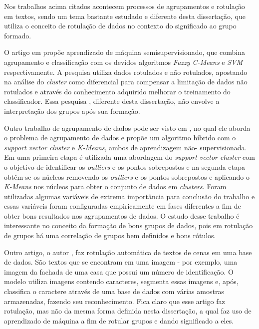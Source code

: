 Nos trabalhos acima citados \cite{Jirasirilerd2018,Yeganova2010,Chen2011} acontecem processos de agrupamentos e rotulação em textos, sendo um tema bastante estudado e diferente desta dissertação, que utiliza o conceito de rotulação de dados no contexto do significado ao grupo formado. 



O artigo em \cite{Gan2013}  propõe aprendizado de máquina semisupervisionado, que combina agrupamento e classificação com os devidos algoritmos \textit{Fuzzy C-Means} e \textit{SVM} respectivamente. A pesquisa utiliza dados rotulados e não rotulados, apostando na análise do \textit{cluster} como diferencial para compensar a limitação de dados não rotulados e através do conhecimento adquirido melhorar o treinamento do classificador. Essa pesquisa \cite{Gan2013}, diferente desta dissertação, não envolve a interpretação dos grupos após sua formação.

Outro trabalho de agrupamento de dados pode ser visto em \cite{Sun2011}, no qual ele aborda o problema de agrupamento de dados e propõe um algoritmo híbrido com o \textit{support vector cluster} e \textit{K-Means}, ambos de aprendizagem não- supervisionada. Em uma primeira etapa é utilizada uma abordagem do \textit{support vector cluster} com o objetivo de identificar os \textit{outliers} e os pontos sobrepostos e na segunda etapa obtêm-se os núcleos removendo os \textit{outliers} e os pontos sobrepostos e aplicando o \textit{K-Means} nos núcleos para obter o conjunto de dados em \textit{clusters}. Foram utilizadas algumas variáveis de extrema importância para conclusão do trabalho e essas variáveis foram configuradas empiricamente em fases diferentes a fim de obter bons resultados nos agrupamentos de dados. O estudo desse trabalho é interessante no conceito da formação de bons grupos de dados, pois em rotulação de grupos há uma correlação de grupos bem definidos e bons rótulos.

Outro artigo, o autor \cite{Iwamura2013}, faz rotulação automática de textos de cenas em uma base de dados. São textos que se encontram em uma imagem - por exemplo, uma imagem da fachada de uma casa que possui um número de identificação. O modelo utiliza imagens contendo caracteres, segmenta essas imagens e, após, classifica o caractere através de uma base de dados com várias amostras armazenadas, fazendo seu reconhecimento. Fica claro que esse artigo faz rotulação, mas não da mesma forma definida nesta dissertação, a qual faz uso de aprendizado de máquina a fim de rotular grupos e dando significado a eles. 

